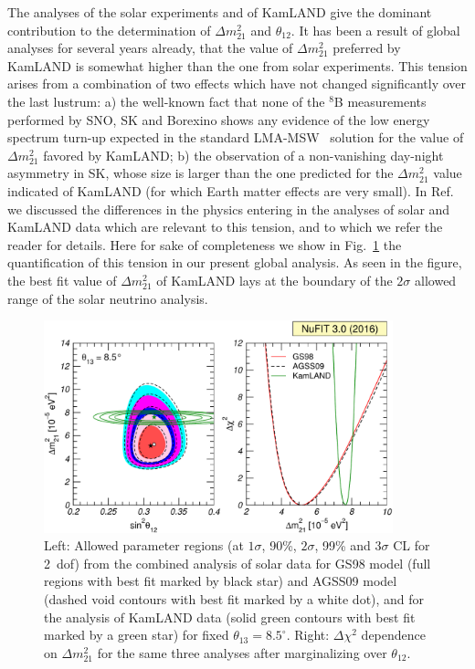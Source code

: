 \documentclass[a4paper, 11pt]{article}
\newcommand{\Dmq}{\Delta m^2}
\begin{document}
The analyses of the solar experiments and of KamLAND give the dominant
contribution to the determination of $\Dmq_{21}$ and $\theta_{12}$.
It has been a result of global analyses for several years already,
that the value of $\Dmq_{21}$ preferred by KamLAND is somewhat higher
than the one from solar experiments. This tension arises from a
combination of two effects which have not changed significantly over
the last lustrum: a) the well-known fact that none of the $^8$B
measurements performed by SNO, SK and Borexino shows any evidence of
the low energy spectrum turn-up expected in the standard
LMA-MSW~\cite{Wolfenstein:1977ue, Mikheev:1986gs} solution for the
value of $\Dmq_{21}$ favored by KamLAND; b) the observation of a
non-vanishing day-night asymmetry in SK, whose size is larger than the
one predicted for the $\Dmq_{21}$ value indicated of KamLAND (for
which Earth matter effects are very small).  In
Ref.~\cite{Gonzalez-Garcia:2014bfa} we discussed the differences in
the physics entering in the analyses of solar and KamLAND data which
are relevant to this tension, and to which we refer the reader for
details. Here for sake of completeness we show in
Fig.~\ref{fig:sun-tension} the quantification of this tension in our
present global analysis. As seen in the figure, the best fit value of
$\Dmq_{21}$ of KamLAND lays at the boundary of the $2\sigma$ allowed
range of the solar neutrino analysis.

\begin{figure}\centering
\includegraphics[width=0.9\textwidth]{fig-sun-tension}
  \caption{Left: Allowed parameter regions (at $1\sigma$, 90\%,
    $2\sigma$, 99\% and $3\sigma$ CL for 2~dof) from the combined
    analysis of solar data for GS98 model (full regions with best fit
    marked by black star) and AGSS09 model (dashed void contours with
    best fit marked by a white dot), and for the analysis of KamLAND
    data (solid green contours with best fit marked by a green star)
    for fixed $\theta_{13}=8.5^\circ$.  Right: $\Delta\chi^2$
    dependence on $\Dmq_{21}$ for the same three analyses after
    marginalizing over $\theta_{12}$.}
  \label{fig:sun-tension}
\end{figure}
\end{document}

